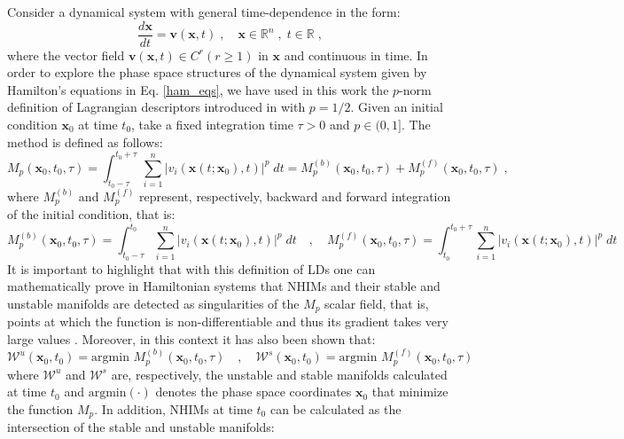 \documentclass[9pt]{article}
\begin{document}
Consider a dynamical system with general time-dependence in the form:
\begin{equation}
\dfrac{d\mathbf{x}}{dt} = \mathbf{v}(\mathbf{x},t) \;,\quad \mathbf{x} \in \mathbb{R}^{n} \;,\; t \in \mathbb{R} \;,
\label{gtp_dynSys}
\end{equation}
where the vector field $\mathbf{v}(\mathbf{x},t) \in C^{r}  (r \geq 1)$ in $\mathbf{x}$ and continuous in time. In order to explore the phase space structures of the dynamical system given by Hamilton's equations in Eq. \eqref{ham_eqs}, we have used in this work the $p$-norm definition of Lagrangian descriptors introduced in \cite{lopesino2017} with $p = 1/2$. Given an initial condition $\mathbf{x}_0$ at time $t_0$, take a fixed integration time $\tau > 0$ and $p \in (0,1]$. The method is defined as follows:
\begin{equation}
M_p(\mathbf{x}_{0},t_0,\tau) = \int^{t_0+\tau}_{t_0-\tau} \, \sum_{i=1}^{n} |v_{i}(\mathbf{x}(t;\mathbf{x}_0),t)|^p \; dt = M_p^{(b)}(\mathbf{x}_{0},t_0,\tau) + M_p^{(f)}(\mathbf{x}_{0},t_0,\tau) \;,
\label{Mp_function}
\end{equation}
where $M_p^{(b)}$ and $M_p^{(f)}$ represent, respectively, backward and forward integration of the initial condition, that is:
\begin{equation}
M_p^{(b)}(\mathbf{x}_{0},t_0,\tau) = \int^{t_0}_{t_0-\tau} \sum_{i=1}^{n} |v_{i}(\mathbf{x}(t;\mathbf{x}_0),t)|^p \; dt \quad,\quad M_p^{(f)}(\mathbf{x}_{0},t_0,\tau) = \int^{t_0+\tau}_{t_0} \sum_{i=1}^{n} |v_{i}(\mathbf{x}(t;\mathbf{x}_0),t)|^p \; dt
\end{equation}
It is important to highlight that with this definition of LDs one can mathematically prove in Hamiltonian systems that NHIMs and their stable and unstable manifolds are detected as singularities of the $M_p$ scalar field, that is, points at which the function is non-differentiable and thus its gradient takes very large values \cite{lopesino2017,demian2017,naik2019a}. Moreover, in this context it has also been shown that:
\begin{equation}
\mathcal{W}^u(\mathbf{x}_{0},t_0) = \textrm{argmin } M_p^{(b)}(\mathbf{x}_{0},t_0,\tau) \quad,\quad \mathcal{W}^s(\mathbf{x}_{0},t_0) = \textrm{argmin } M_p^{(f)}(\mathbf{x}_{0},t_0,\tau)
\label{min_LD_manifolds}
\end{equation}
where $\mathcal{W}^u$ and $\mathcal{W}^s$ are, respectively, the unstable and stable manifolds calculated at time $t_0$ and $\textrm{argmin}(\cdot)$ denotes the phase space coordinates $\mathbf{x}_0$ that minimize the function $M_p$. In addition, NHIMs at time $t_0$ can be calculated as the intersection of the stable and unstable manifolds:
\end{document}
